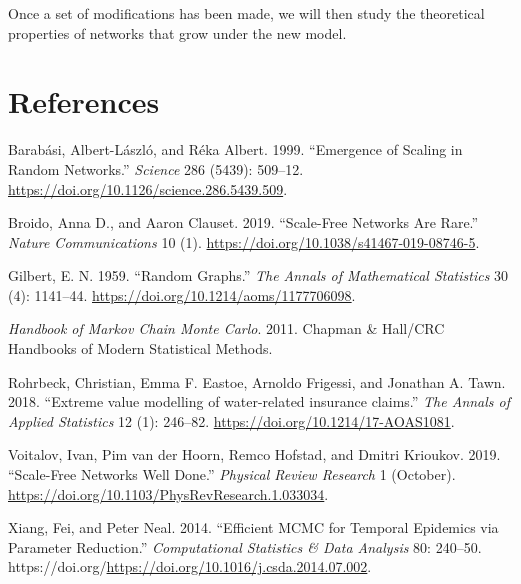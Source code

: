 \documentclass[
]{article}
\newlength{\cslhangindent}
\newenvironment{CSLReferences}[2] %
 {\begin{list}{}{%
  \setlength{\itemindent}{0pt}
  \setlength{\leftmargin}{0pt}
  \setlength{\parsep}{0pt}
  \ifodd #1
   \setlength{\leftmargin}{\cslhangindent}
   \setlength{\itemindent}{-1\cslhangindent}
  \fi
  \setlength{\itemsep}{#2\baselineskip}}}
 {\end{list}}
\begin{document}
Once a set of modifications has been made, we will then study the
theoretical properties of networks that grow under the new model.

\newpage{}

\section*{References}\label{references}

\label{refs}
\begin{CSLReferences}{1}{0}
Barabási, Albert-László, and Réka Albert. 1999. {``Emergence of Scaling
in Random Networks.''} \emph{Science} 286 (5439): 509--12.
\url{https://doi.org/10.1126/science.286.5439.509}.

Broido, Anna D., and Aaron Clauset. 2019. {``Scale-Free Networks Are
Rare.''} \emph{Nature Communications} 10 (1).
\url{https://doi.org/10.1038/s41467-019-08746-5}.

Gilbert, E. N. 1959. {``{Random Graphs}.''} \emph{The Annals of
Mathematical Statistics} 30 (4): 1141--44.
\url{https://doi.org/10.1214/aoms/1177706098}.

\emph{Handbook of Markov Chain Monte Carlo}. 2011. Chapman \& Hall/CRC
Handbooks of Modern Statistical Methods.

Rohrbeck, Christian, Emma F. Eastoe, Arnoldo Frigessi, and Jonathan A.
Tawn. 2018. {``{Extreme value modelling of water-related insurance
claims}.''} \emph{The Annals of Applied Statistics} 12 (1): 246--82.
\url{https://doi.org/10.1214/17-AOAS1081}.

Voitalov, Ivan, Pim van der Hoorn, Remco Hofstad, and Dmitri Krioukov.
2019. {``Scale-Free Networks Well Done.''} \emph{Physical Review
Research} 1 (October).
\url{https://doi.org/10.1103/PhysRevResearch.1.033034}.

Xiang, Fei, and Peter Neal. 2014. {``Efficient MCMC for Temporal
Epidemics via Parameter Reduction.''} \emph{Computational Statistics \&
Data Analysis} 80: 240--50.
https://doi.org/\url{https://doi.org/10.1016/j.csda.2014.07.002}.

\end{CSLReferences}
\end{document}
